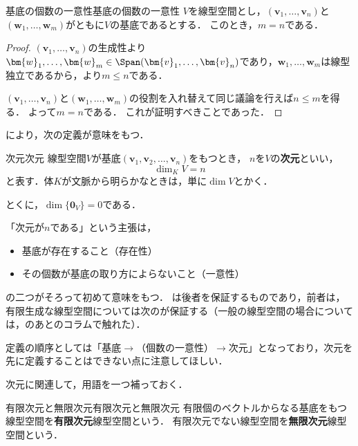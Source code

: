 \begin{theorem}{基底の個数の一意性}{基底の個数の一意性}
  $V$を線型空間とし，$(\bm{v}_1, \dots, \bm{v}_n)$と$(\bm{w}_1, \dots, \bm{w}_m)$がともに$V$の基底であるとする．
  このとき，$m = n$である．
\end{theorem}

\begin{leftbar}
\begin{proof}
  $(\bm{v}_1, \dots, \bm{v}_n)$の生成性より$\bm{w}_1, \dots, \bm{w}_m \in \Span(\bm{v}_1, \dots, \bm{v}_n)$であり，$\bm{w}_1, \dots, \bm{w}_m$は線型独立であるから，より$m \le n$である．

  $(\bm{v}_1, \dots, \bm{v}_n)$と$(\bm{w}_1, \dots, \bm{w}_m)$の役割を入れ替えて同じ議論を行えば$n \le m$を得る．
  よって$m = n$である．
  これが証明すべきことであった．
\end{proof}
\end{leftbar}

により，次の定義が意味をもつ．

\begin{definition}{次元}{次元}
  線型空間$V$が基底$(\bm{v}_1, \bm{v}_2, \dots, \bm{v}_n)$をもつとき，
  $n$を$V$の\textbf{次元}といい，
  \[
    \dim_K V = n
  \]
  と表す．体$K$が文脈から明らかなときは，単に$\dim V$とかく．

  とくに，$\dim \{\bm{0}_V\} = 0$である．
\end{definition}

\begin{remark}[「次元」が意味をもつために]
  「次元が$n$である」という主張は，
  \begin{itemize}
    \item 基底が存在すること（存在性）
    \item その個数が基底の取り方によらないこと（一意性）
  \end{itemize}
  の二つがそろって初めて意味をもつ．
  は後者を保証するものであり，前者は，有限生成な線型空間については次のが保証する（一般の線型空間の場合については，のあとのコラムで触れた）．

  定義の順序としては「基底$\to$（個数の一意性）$\to$次元」となっており，次元を先に定義することはできない点に注意してほしい．
\end{remark}

次元に関連して，用語を一つ補っておく．

\begin{definition}{有限次元と無限次元}{有限次元と無限次元}
  有限個のベクトルからなる基底をもつ線型空間を\textbf{有限次元}線型空間という．
  有限次元でない線型空間を\textbf{無限次元}線型空間という．
\end{definition}

